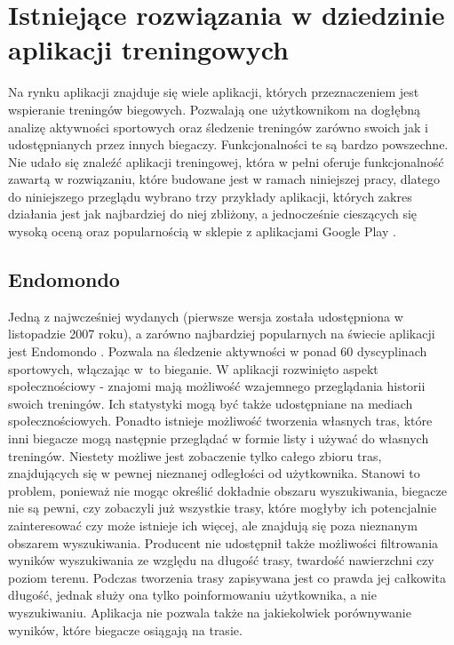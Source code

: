\section{Istniejące rozwiązania w dziedzinie aplikacji treningowych}\label{chap:istniejace}
Na rynku aplikacji znajduje się wiele aplikacji, których przeznaczeniem jest wspieranie treningów biegowych. Pozwalają one użytkownikom na dogłębną analizę aktywności sportowych oraz śledzenie treningów zarówno swoich jak i udostępnianych przez innych biegaczy. Funkcjonalności te są bardzo powszechne. Nie udało się znaleźć aplikacji treningowej, która w pełni oferuje funkcjonalność zawartą w rozwiązaniu, które budowane jest w ramach niniejszej pracy, dlatego do niniejszego przeglądu wybrano trzy przykłady aplikacji, których zakres działania jest jak najbardziej do niej zbliżony, a jednocześnie cieszących się wysoką oceną oraz popularnością w sklepie z aplikacjami Google Play \cite{googleplay}. 
\subsection{Endomondo}
Jedną z najwcześniej wydanych (pierwsze wersja została udostępniona w listopadzie 2007 roku), a zarówno najbardziej popularnych na świecie aplikacji jest Endomondo \cite{endomondo}.  Pozwala na śledzenie aktywności w ponad 60 dyscyplinach sportowych, włączając w~to bieganie. W aplikacji rozwinięto aspekt społecznościowy - znajomi mają możliwość wzajemnego przeglądania historii swoich treningów. Ich statystyki mogą być także udostępniane na mediach społecznościowych. Ponadto istnieje możliwość tworzenia własnych tras, które inni biegacze mogą następnie przeglądać w formie listy i używać do własnych treningów. Niestety możliwe jest zobaczenie tylko całego zbioru tras, znajdujących się w pewnej nieznanej odległości od użytkownika. Stanowi to problem, ponieważ nie mogąc określić dokładnie obszaru wyszukiwania, biegacze nie są pewni, czy zobaczyli już wszystkie trasy, które mogłyby ich potencjalnie zainteresować czy może istnieje ich więcej, ale znajdują się poza nieznanym obszarem wyszukiwania. Producent nie udostępnił także możliwości filtrowania wyników wyszukiwania ze względu na długość trasy, twardość nawierzchni czy poziom terenu. Podczas tworzenia trasy zapisywana jest co prawda jej całkowita długość, jednak służy ona tylko poinformowaniu użytkownika, a nie wyszukiwaniu. Aplikacja nie pozwala także na jakiekolwiek porównywanie wyników, które biegacze osiągają na trasie.
